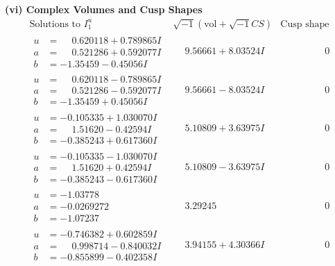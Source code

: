 \documentclass[1p]{elsarticle_modified}
\theoremstyle{definition}
\newcommand{\I}{\sqrt{-1}}
\begin{document}
\newpage\flushleft \textbf{(vi) Complex Volumes and Cusp Shapes}
$$\begin{array}{c|c|c}  
\text{Solutions to }I^u_{1}& \I (\text{vol} + \sqrt{-1}CS) & \text{Cusp shape}\\
 \hline 
\begin{aligned}
u &= \phantom{-}0.620118 + 0.789865 I \\
a &= \phantom{-}0.521286 + 0.592077 I \\
b &= -1.35459 - 0.45056 I\end{aligned}
 & \phantom{-}9.56661 + 8.03524 I & \phantom{-0.000000 } 0 \\ \hline\begin{aligned}
u &= \phantom{-}0.620118 - 0.789865 I \\
a &= \phantom{-}0.521286 - 0.592077 I \\
b &= -1.35459 + 0.45056 I\end{aligned}
 & \phantom{-}9.56661 - 8.03524 I & \phantom{-0.000000 } 0 \\ \hline\begin{aligned}
u &= -0.105335 + 1.030070 I \\
a &= \phantom{-}1.51620 - 0.42594 I \\
b &= -0.385243 + 0.617360 I\end{aligned}
 & \phantom{-}5.10809 + 3.63975 I & \phantom{-0.000000 } 0 \\ \hline\begin{aligned}
u &= -0.105335 - 1.030070 I \\
a &= \phantom{-}1.51620 + 0.42594 I \\
b &= -0.385243 - 0.617360 I\end{aligned}
 & \phantom{-}5.10809 - 3.63975 I & \phantom{-0.000000 } 0 \\ \hline\begin{aligned}
u &= -1.03778\phantom{ +0.000000I} \\
a &= -0.0269272\phantom{ +0.000000I} \\
b &= -1.07237\phantom{ +0.000000I}\end{aligned}
 & \phantom{-}3.29245\phantom{ +0.000000I} & \phantom{-0.000000 } 0 \\ \hline\begin{aligned}
u &= -0.746382 + 0.602859 I \\
a &= \phantom{-}0.998714 - 0.840032 I \\
b &= -0.855899 - 0.402358 I\end{aligned}
 & \phantom{-}3.94155 + 4.30366 I & \phantom{-0.000000 } 0 \\ \hline\begin{aligned}

\end{aligned}
\end{array}$$
\end{document}
